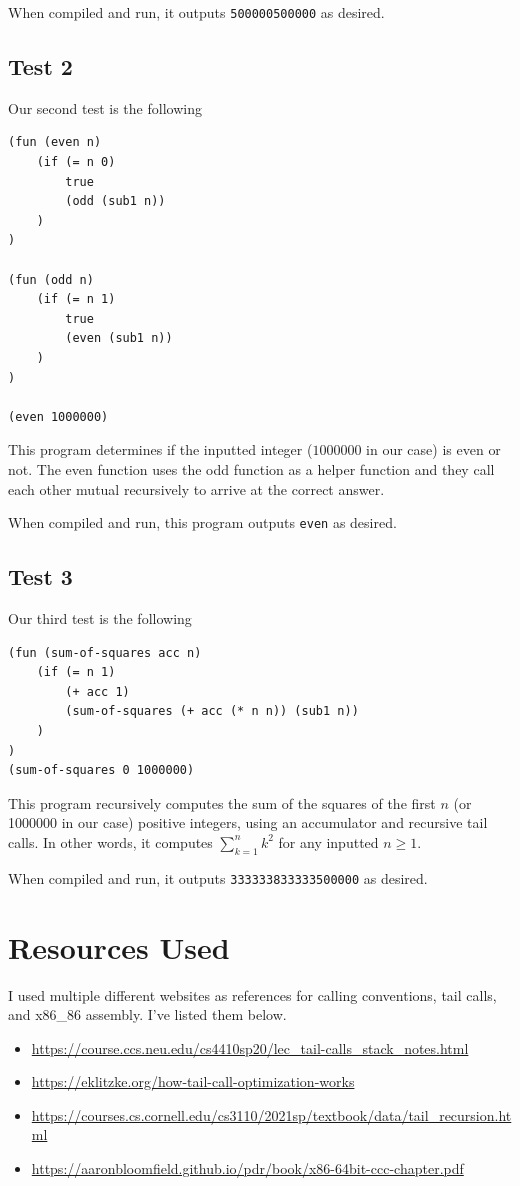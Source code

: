 \documentclass[12pt]{article}
\begin{document}
When compiled and run, it outputs \verb|500000500000| as desired.

\subsection{Test 2}
Our second test is the following
\begin{verbatim}
(fun (even n)
    (if (= n 0)
        true
        (odd (sub1 n))
    )
)

(fun (odd n)
    (if (= n 1)
        true
        (even (sub1 n))
    )
)

(even 1000000)\end{verbatim}
This program determines if the inputted integer ($1000000$ in our case) is even or not. The even function uses
the odd function as a helper function and they call each other mutual recursively to arrive at the correct
answer. \newline

When compiled and run, this program outputs \verb|even| as desired.

\subsection{Test 3}
Our third test is the following
\begin{verbatim}
(fun (sum-of-squares acc n)
    (if (= n 1)
        (+ acc 1)
        (sum-of-squares (+ acc (* n n)) (sub1 n))
    )
)
(sum-of-squares 0 1000000)\end{verbatim}
This program recursively computes the sum of the squares of the first $n$ (or 1000000 in our 
case) positive integers, using an accumulator and recursive tail calls. In other words, it computes
$\sum_{k=1}^n k^2$ for any inputted $n\geq1$. \newline

When compiled and run, it outputs \verb|333333833333500000| as desired.
\section{Resources Used}
I used multiple different websites as references for calling conventions, tail calls, and x86\_86 assembly. I've
listed them below.
\begin{itemize}
    \item\url{https://course.ccs.neu.edu/cs4410sp20/lec_tail-calls_stack_notes.html} 
    \item \url{https://eklitzke.org/how-tail-call-optimization-works} 
    \item \url{https://courses.cs.cornell.edu/cs3110/2021sp/textbook/data/tail_recursion.html}
    \item \url{https://aaronbloomfield.github.io/pdr/book/x86-64bit-ccc-chapter.pdf}
\end{itemize}
\end{document}
